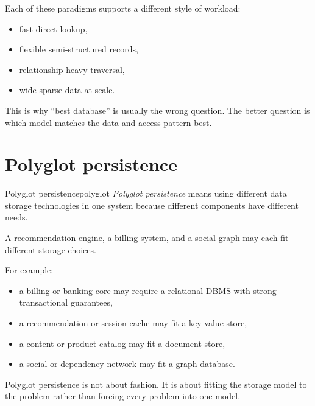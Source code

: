 \documentclass[11pt,a4paper,openany]{book}
\begin{document}
Each of these paradigms supports a different style of workload:
\begin{itemize}
\item fast direct lookup,
\item flexible semi-structured records,
\item relationship-heavy traversal,
\item wide sparse data at scale.
\end{itemize}

This is why ``best database'' is usually the wrong question. The better question is which model matches the data and access pattern best.

\section{Polyglot persistence}
\begin{definition}{Polyglot persistence}{polyglot}
\emph{Polyglot persistence} means using different data storage technologies in one system because different components have different needs.
\end{definition}

A recommendation engine, a billing system, and a social graph may each fit different storage choices.

For example:
\begin{itemize}
\item a billing or banking core may require a relational DBMS with strong transactional guarantees,
\item a recommendation or session cache may fit a key-value store,
\item a content or product catalog may fit a document store,
\item a social or dependency network may fit a graph database.
\end{itemize}

Polyglot persistence is not about fashion. It is about fitting the storage model to the problem rather than forcing every problem into one model.
\end{document}
